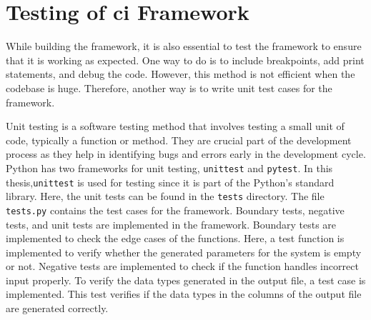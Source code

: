 \section{Testing of \acrshort{ci} Framework}
While building the framework, it is also essential to test the framework to ensure that it is working as expected. One way to do is to include breakpoints, add print 
statements, and debug the code. However, this method is not efficient when the codebase is huge. Therefore, another way is to write unit test cases for the framework.

Unit testing is a software testing method that involves testing a small unit of code, typically a function or method. They are crucial part of the development 
process as they help in identifying bugs and errors early in the development cycle. Python has two frameworks for unit testing, \texttt{unittest} and 
\texttt{pytest}. In this thesis,\texttt{unittest} is used for testing since it is part of the Python's standard library. Here, the unit tests can be found 
in the \texttt{tests} directory. The file \texttt{tests.py} contains the test cases for the framework. %
Boundary tests, negative tests, and unit tests are implemented in the framework. Boundary tests are implemented to check the edge cases of the functions. Here, 
a test function is implemented to verify whether the generated parameters for the system is empty or not. Negative tests are implemented to check if the function 
handles incorrect input properly. To verify the data types generated in the output file, a test case is implemented. This test verifies if the data types in 
the columns of the output file are generated correctly. 

